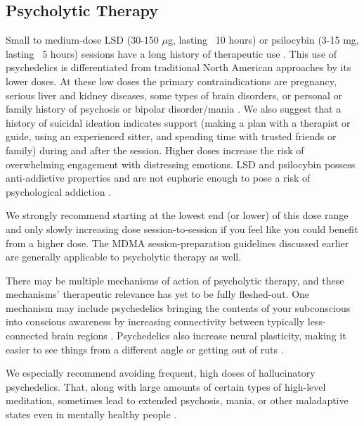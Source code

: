 \documentclass[12pt,letterpaper]{article}
\begin{document}
\subsection{Psycholytic Therapy}
\label{psychedelics}
Small to medium-dose LSD (30-150 $\mu$g, lasting ~10 hours) or psilocybin (3-15 mg, lasting ~5 hours) sessions have a long history of therapeutic use \cite{passiePsycholytic}. This use of psychedelics is differentiated from traditional North American approaches by its lower doses. At these low doses the primary contraindications are pregnancy, serious liver and kidney diseases, some types of brain disorders, or personal or family history of psychosis or bipolar disorder/mania \cite{schlagPsychedelicAdverseEffects,passiePsycholytic}. We also suggest that a history of suicidal ideation indicates support (making a plan with a therapist or guide, using an experienced sitter, and spending time with trusted friends or family) during and after the session. Higher doses increase the risk of overwhelming engagement with distressing emotions. LSD and psilocybin possess anti-addictive properties and are not euphoric enough to pose a risk of psychological addiction \cite{principeAddiction}.

We strongly recommend starting at the lowest end (or lower) of this dose range and only slowly increasing dose session-to-session if you feel like you could benefit from a higher dose. The MDMA session-preparation guidelines discussed earlier are generally applicable to psycholytic therapy as well.

There may be multiple mechanisms of action of psycholytic therapy, and these mechanisms' therapeutic relevance has yet to be fully fleshed-out. One mechanism may include psychedelics bringing the contents of your subconscious into conscious awareness by increasing connectivity between typically less-connected brain regions \cite{linguiti2023functional}. Psychedelics also increase neural plasticity, making it easier to see things from a different angle or getting out of ruts \cite{nardou2023psychedelics}. 

We especially recommend avoiding frequent, high doses of hallucinatory psychedelics. That, along with large amounts of certain types of high-level meditation, sometimes lead to extended psychosis, mania, or other maladaptive states even in mentally healthy people \cite{ingram2018mastering}.
\end{document}
